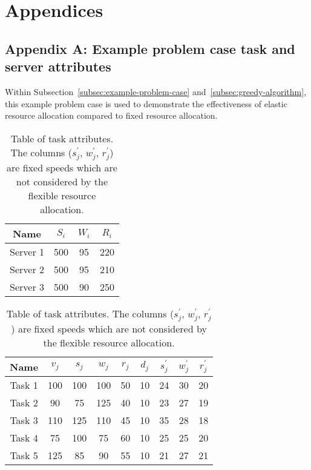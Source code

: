 \section*{Appendices}

\subsection*{Appendix A: Example problem case task and server attributes}
Within Subsection~\ref{subsec:example-problem-case} and~\ref{subsec:greedy-algorithm}, this example problem case is used
to demonstrate the effectiveness of elastic resource allocation compared to fixed resource allocation.
\begin{table}[h]
    \begin{minipage}{1.8in}
        \caption{Table of server attributes}
        \begin{tabular}{|c|c|c|c|}
            \hline
            Name     & $S_i$ & $W_i$ & $R_i$ \\ \hline
            Server 1 & 500   & 95    & 220   \\ \hline
            Server 2 & 500   & 95    & 210   \\ \hline
            Server 3 & 500   & 90    & 250   \\ \hline
        \end{tabular}
    \end{minipage}
    \begin{minipage}{3.5in}
        \caption{Table of task attributes. The columns ($s^{'}_j$, $w^{'}_j$, $r^{'}_j$) are fixed speeds which are not
        considered by the flexible resource allocation.}
        \begin{tabular}{|c|c|c|c|c|c|c|c|c|}
            \hline
            Name    & $v_j$ & $s_j$ & $w_j$ & $r_j$ & $d_j$ & $s^{'}_j$ & $w^{'}_j$ & $r^{'}_j$ \\ \hline
            Task 1  & 100   & 100   & 100   & 50    & 10    & 24        & 30        & 20        \\ \hline
            Task 2  & 90    & 75    & 125   & 40    & 10    & 23        & 27        & 19        \\ \hline
            Task 3  & 110   & 125   & 110   & 45    & 10    & 35        & 28        & 18        \\ \hline
            Task 4  & 75    & 100   & 75    & 60    & 10    & 25        & 25        & 20        \\ \hline
            Task 5  & 125   & 85    & 90    & 55    & 10    & 21        & 27        & 21        \\ \hline

\end{tabular}
\end{minipage}
\end{table}
